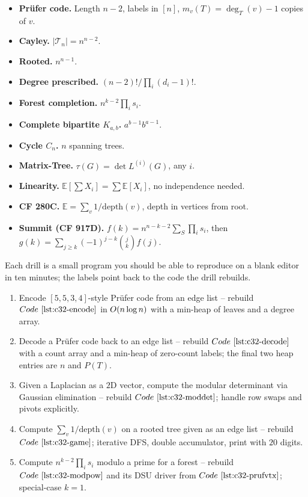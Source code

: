 \begin{quickref}
\begin{itemize}[nosep]
  \item \textbf{Pr\"ufer code.}  Length \(n-2\), labels in \([n]\),
        \(m_v(T)=\deg_T(v)-1\) copies of \(v\).
  \item \textbf{Cayley.}  \(|\mathcal{T}_n|=n^{n-2}\).
  \item \textbf{Rooted.}  \(n^{n-1}\).
  \item \textbf{Degree prescribed.}  \((n-2)!/\prod_i(d_i-1)!\).
  \item \textbf{Forest completion.}  \(n^{k-2}\prod_i s_i\).
  \item \textbf{Complete bipartite \(K_{a,b}\).}  \(a^{b-1}b^{a-1}\).
  \item \textbf{Cycle \(C_n\).}  \(n\) spanning trees.
  \item \textbf{Matrix-Tree.}  \(\tau(G)=\det L^{(i)}(G)\), any \(i\).
  \item \textbf{Linearity.}  \(\mathbb{E}[\sum X_i]=\sum \mathbb{E}[X_i]\),
        no independence needed.
  \item \textbf{CF 280C.}  \(\mathbb{E}=\sum_v 1/\mathrm{depth}(v)\),
        depth in vertices from root.
  \item \textbf{Summit (CF 917D).}  \(f(k)=n^{n-k-2}\sum_S\prod_i s_i\),
        then \(g(k)=\sum_{j\ge k}(-1)^{j-k}\binom{j}{k}f(j)\).
\end{itemize}
\end{quickref}


Each drill is a small program you should be able to reproduce on a blank
editor in ten minutes; the labels point back to the code the drill rebuilds.

\begin{enumerate}[nosep]
  \item Encode \([5,5,3,4]\)-style Pr\"ufer code from an edge list --
        rebuild \(\coderef{c32-encode}\) in \(O(n\log n)\) with a
        min-heap of leaves and a degree array.
  \item Decode a Pr\"ufer code back to an edge list -- rebuild
        \(\coderef{c32-decode}\) with a count array and a min-heap of
        zero-count labels; the final two heap entries are \(n\) and \(P(T)\).
  \item Given a Laplacian as a \(2\)D vector, compute the modular
        determinant via Gaussian elimination -- rebuild
        \(\coderef{c32-moddet}\); handle row swaps and pivots explicitly.
  \item Compute \(\sum_v 1/\mathrm{depth}(v)\) on a rooted tree given
        as an edge list -- rebuild \(\coderef{c32-game}\); iterative DFS,
        double accumulator, print with \(20\) digits.
  \item Compute \(n^{k-2}\prod_i s_i\) modulo a prime for a forest --
        rebuild \(\coderef{c32-modpow}\) and its DSU driver from
        \(\coderef{c32-prufvtx}\); special-case \(k=1\).
\end{enumerate}

